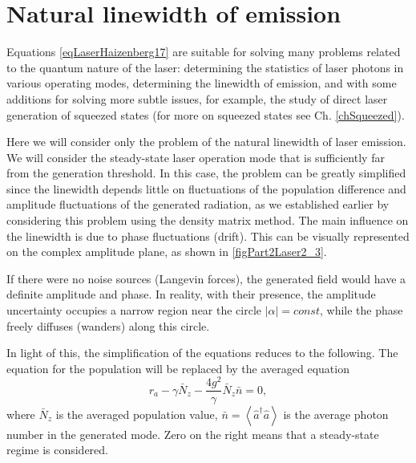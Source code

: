 \section{Natural linewidth of emission}
Equations \eqref{eqLaserHaizenberg17} are suitable for solving many
problems related to the quantum nature of the laser: determining the statistics
of laser photons in various operating modes, determining the linewidth of
emission, and with some additions for solving more subtle
issues, for example, the study of direct laser generation of
squeezed states (for more on squeezed states see Ch. \ref{chSqueezed}). 



Here we will consider only the problem of the natural linewidth of
laser emission. We will consider the steady-state laser operation
mode that is sufficiently far from the generation threshold. In this case, the problem
can be greatly simplified since the linewidth depends little on fluctuations
of the population difference and amplitude fluctuations of the generated
radiation, as we established earlier by considering this problem using the density matrix method.
The main influence on the linewidth is due to
phase fluctuations (drift). This can be visually represented on the complex amplitude plane,
as shown in \autoref{figPart2Laser2_3}.

If there were no noise sources (Langevin forces),
the generated field would have a definite amplitude and phase. In
reality, with their presence, the amplitude uncertainty occupies
a narrow region near the circle $\left|\alpha\right| = const$, while the phase
freely diffuses (wanders) along this circle. 

In light of this, the simplification of the equations reduces to
the following. The equation for the population will be replaced by the averaged equation 
\begin{equation}
r_a - \gamma \bar{N}_z - \frac{4 g^2}{\gamma}\bar{N}_z\bar{n} = 0,
\label{eqLaserHaizenberg19}
\end{equation}
where $\bar{N}_z$ is the averaged population value, $\bar{n} =
\left<\hat{a}^{\dag}\hat{a}\right>$ is the average photon number in
the generated mode. Zero on the right means that a
steady-state regime is considered. 


